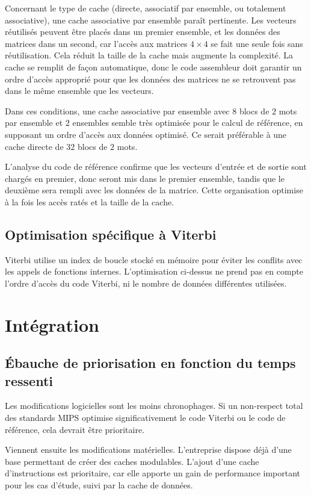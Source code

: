 \documentclass[a11paper]{article}
\begin{document}
Concernant le type de cache (directe, associatif par ensemble, ou totalement
associative), une cache associative par ensemble paraît pertinente.
Les vecteurs réutilisés peuvent être placés dans un premier ensemble,
et les données des matrices dans un second, car l'accès aux matrices
$4\times4$ se fait une seule fois sans réutilisation. Cela réduit la taille
de la cache mais augmente la complexité. La cache se remplit de façon
automatique, donc le code assembleur doit garantir un ordre d'accès
approprié pour que les données des matrices ne se retrouvent pas dans
le même ensemble que les vecteurs.

Dans ces conditions, une cache associative par ensemble avec
$8$ blocs de $2$ mots par ensemble et $2$ ensembles semble
très optimisée pour le calcul de référence, en supposant un ordre
d'accès aux données optimisé. Ce serait préférable à une cache
directe de $32$ blocs de $2$ mots.

L'analyse du code de référence confirme que les vecteurs d'entrée
et de sortie sont chargés en premier, donc seront mis dans
le premier ensemble, tandis que le deuxième sera rempli avec
les données de la matrice. Cette organisation optimise à la fois
les accès ratés et la taille de la cache.

\subsection{Optimisation spécifique à Viterbi}

Viterbi utilise un index de boucle stocké en mémoire pour éviter
les conflits avec les appels de fonctions internes. L'optimisation
ci-dessus ne prend pas en compte l'ordre d'accès du code Viterbi,
ni le nombre de données différentes utilisées.

\section{Intégration}

\subsection{Ébauche de priorisation en fonction du temps ressenti}

Les modifications logicielles sont les moins chronophages. Si un non-respect total
des standards MIPS optimise significativement le code Viterbi ou le code de
référence, cela devrait être prioritaire.

Viennent ensuite les modifications matérielles. L'entreprise dispose déjà d'une
base permettant de créer des caches modulables. L'ajout d'une cache d'instructions
est prioritaire, car elle apporte un gain de performance important pour les cas
d'étude, suivi par la cache de données.
\end{document}
